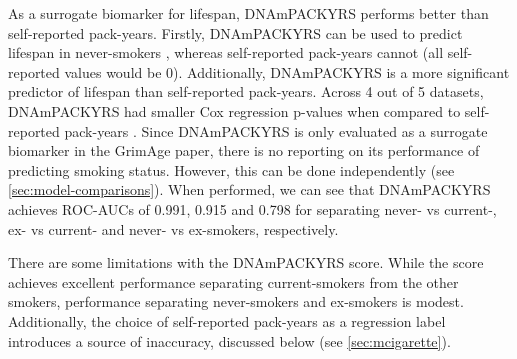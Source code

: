 \documentclass{article} %
\begin{document}
As a surrogate biomarker for lifespan, DNAmPACKYRS performs better than self-reported pack-years. Firstly, DNAmPACKYRS can be used to predict lifespan in never-smokers \cite{lu2019dna}, whereas self-reported pack-years cannot (all self-reported values would be 0). Additionally, DNAmPACKYRS is a more significant predictor of lifespan than self-reported pack-years. Across 4 out of 5 datasets, DNAmPACKYRS had smaller Cox regression p-values when compared to self-reported pack-years \cite{lu2019dna}. Since DNAmPACKYRS is only evaluated as a surrogate biomarker in the GrimAge paper, there is no reporting on its performance of predicting smoking status. However, this can be done independently (see \ref{sec:model-comparisons}). When performed, we can see that DNAmPACKYRS achieves ROC-AUCs of 0.991, 0.915 and 0.798 for separating never- vs current-, ex- vs current- and never- vs ex-smokers, respectively.

There are some limitations with the DNAmPACKYRS score. While the score achieves excellent performance separating current-smokers from the other smokers, performance separating never-smokers and ex-smokers is modest. Additionally, the choice of self-reported pack-years as a regression label introduces a source of inaccuracy, discussed below (see \ref{sec:mcigarette}).

\end{document}
